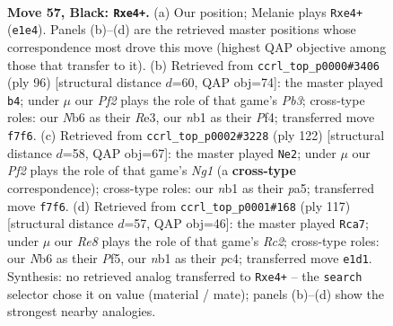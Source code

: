 \documentclass[11pt]{article}
\begin{document}
\clearpage

\begin{figure}[p]\centering
\begin{subfigure}{0.46\textwidth}\centering
\resizebox{\linewidth}{!}{%
\newchessgame
\chessboard[
  setfen={7k/5p1p/1n4p1/p3p1P1/P3P1KP/1P4R1/6P1/RN2rr2 b - - 2 57},
  showmover=false,
  pgfstyle=straightmove, color=movearrow, markmove={e1-e4}
]}
\caption{}
\end{subfigure}\hfill
\begin{subfigure}{0.46\textwidth}\centering
\resizebox{\linewidth}{!}{%
\newchessgame
\chessboard[
  setfen={r7/5p2/3kp2p/p1p2r2/R4P1P/PP2RK2/2P5/8 w - - 6 49},
  showmover=false,
  pgfstyle=straightmove, color=movearrow, markmove={b3-b4}
]}
\caption{}
\end{subfigure}
\\[4pt]
\begin{subfigure}{0.46\textwidth}\centering
\resizebox{\linewidth}{!}{%
\newchessgame
\chessboard[
  setfen={6r1/7p/rk4pP/pn1pPp2/R1pP1P2/2P2K2/2P5/R5N1 w - - 11 62},
  showmover=false,
  pgfstyle=straightmove, color=movearrow, markmove={g1-e2}
]}
\caption{}
\end{subfigure}\hfill
\begin{subfigure}{0.46\textwidth}\centering
\resizebox{\linewidth}{!}{%
\newchessgame
\chessboard[
  setfen={8/2rk4/3p2p1/3P1p2/r1PKpPpP/PRR3P1/8/8 b - - 7 59},
  showmover=false,
  pgfstyle=straightmove, color=movearrow, markmove={c7-a7}
]}
\caption{}
\end{subfigure}
\caption{\textbf{Move 57, Black: \texttt{Rxe4+}.} (a) Our position; Melanie plays \texttt{Rxe4+} (\texttt{e1e4}). Panels (b)--(d) are the retrieved master positions whose correspondence most drove this move (highest QAP objective among those that transfer to it). (b) Retrieved from \texttt{ccrl\_top\_p0000\#3406} (ply 96) [structural distance $d$=60, QAP obj=74]: the master played \texttt{b4}; under $\mu$ our \emph{Pf2} plays the role of that game's \emph{Pb3}; cross-type roles: our \emph{N}b6 as their \emph{R}e3, our \emph{n}b1 as their \emph{P}f4; transferred move \texttt{f7f6}. (c) Retrieved from \texttt{ccrl\_top\_p0002\#3228} (ply 122) [structural distance $d$=58, QAP obj=67]: the master played \texttt{Ne2}; under $\mu$ our \emph{Pf2} plays the role of that game's \emph{Ng1} (a \textbf{cross-type} correspondence); cross-type roles: our \emph{n}b1 as their \emph{p}a5; transferred move \texttt{f7f6}. (d) Retrieved from \texttt{ccrl\_top\_p0001\#168} (ply 117) [structural distance $d$=57, QAP obj=46]: the master played \texttt{Rca7}; under $\mu$ our \emph{Re8} plays the role of that game's \emph{Rc2}; cross-type roles: our \emph{N}b6 as their \emph{P}f5, our \emph{n}b1 as their \emph{p}c4; transferred move \texttt{e1d1}. Synthesis: no retrieved analog transferred to \texttt{Rxe4+} -- the \texttt{search} selector chose it on value (material / mate); panels (b)--(d) show the strongest nearby analogies.}
\label{fig:thought-m113}
\end{figure}
\end{document}
